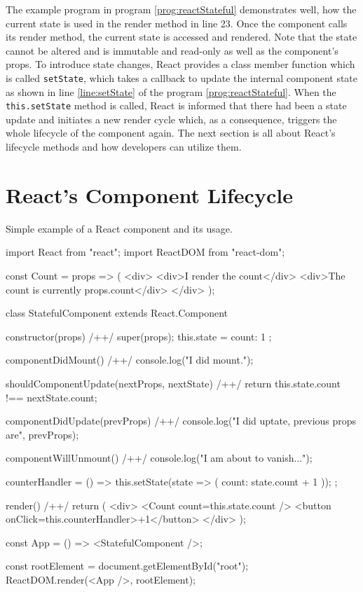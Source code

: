 The example program in program \ref{prog:reactStateful} demonstrates well, how the current state is used in the render method in line 23. Once the component calls its render method, the current state is accessed and rendered. Note that the state cannot be altered and is immutable and read-only as well as the component's props. To introduce state changes, React provides a class member function which is called \texttt{setState}, which takes a callback to update the internal component state as shown in line \ref{line:setState} of the program \ref{prog:reactStateful}. When the \texttt{this.setState} method is called, React is informed that there had been a state update and initiates a new render cycle which, as a consequence, triggers the whole lifecycle of the component again. The next section is all about React's lifecycle methods and how developers can utilize them.



\section{React's Component Lifecycle}

\begin{program}
\caption{Simple example of a React component and its usage.} 
\label{prog:reactLifecycleComponent}
\begin{JsCode}
import React from "react";
import ReactDOM from "react-dom";

const Count = props => (
  <div>
    <div>I render the count</div>
    <div>The count is currently {props.count}</div>
  </div>
);

class StatefulComponent extends React.Component {
  constructor(props) { /+\label{line:lifecycle1}+/
    super(props);
    this.state = {
      count: 1
    };
  }

  componentDidMount() { /+\label{line:lifecycle2}+/
    console.log("I did mount.");
  }

  shouldComponentUpdate(nextProps, nextState) { /+\label{line:lifecycle3}+/
    return this.state.count !== nextState.count;
  }

  componentDidUpdate(prevProps) { /+\label{line:lifecycle4}+/
    console.log("I did uptate, previous props are", prevProps);
  }

  componentWillUnmount() { /+\label{line:lifecycle5}+/
    console.log("I am about to vanish...");
  }

  counterHandler = () => {
    this.setState(state => ({ count: state.count + 1 }));
  };

  render() { /+\label{line:lifecycle6}+/
    return (
      <div>
        <Count count={this.state.count} />
        <button onClick={this.counterHandler}>+1</button>
      </div>
    );
  }
}
  
const App = () => <StatefulComponent />;

const rootElement = document.getElementById("root");
ReactDOM.render(<App />, rootElement);  
\end{JsCode}
\end{program}

